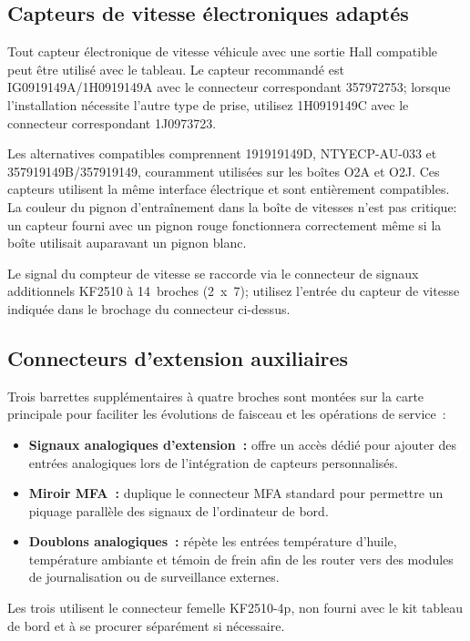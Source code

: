 \subsection{Capteurs de vitesse électroniques adaptés}
Tout capteur électronique de vitesse véhicule avec une sortie Hall compatible peut être utilisé avec le tableau. Le capteur recommandé est \mbox{IG0919149A/1H0919149A} avec le connecteur correspondant \mbox{357972753}; lorsque l'installation nécessite l'autre type de prise, utilisez \mbox{1H0919149C} avec le connecteur correspondant \mbox{1J0973723}.

Les alternatives compatibles comprennent \mbox{191919149D}, \mbox{NTYECP-AU-033} et \mbox{357919149B/357919149}, couramment utilisées sur les boîtes O2A et O2J. Ces capteurs utilisent la même interface électrique et sont entièrement compatibles. La couleur du pignon d'entraînement dans la boîte de vitesses n'est pas critique: un capteur fourni avec un pignon rouge fonctionnera correctement même si la boîte utilisait auparavant un pignon blanc.

Le signal du compteur de vitesse se raccorde via le connecteur de signaux additionnels \mbox{KF2510} à 14~broches (2~x~7); utilisez l'entrée du capteur de vitesse indiquée dans le brochage du connecteur ci-dessus.

\subsection{Connecteurs d'extension auxiliaires}
Trois barrettes supplémentaires à quatre broches sont montées sur la carte principale pour faciliter les évolutions de faisceau et les opérations de service~:
\begin{itemize}
    \item \textbf{Signaux analogiques d'extension~:} offre un accès dédié pour ajouter des entrées analogiques lors de l'intégration de capteurs personnalisés.
    \item \textbf{Miroir MFA~:} duplique le connecteur \textsc{MFA} standard pour permettre un piquage parallèle des signaux de l'ordinateur de bord.
    \item \textbf{Doublons analogiques~:} répète les entrées température d'huile, température ambiante et témoin de frein afin de les router vers des modules de journalisation ou de surveillance externes.
\end{itemize}
Les trois utilisent le connecteur femelle \mbox{KF2510-4p}, non fourni avec le kit tableau de bord et à se procurer séparément si nécessaire.

